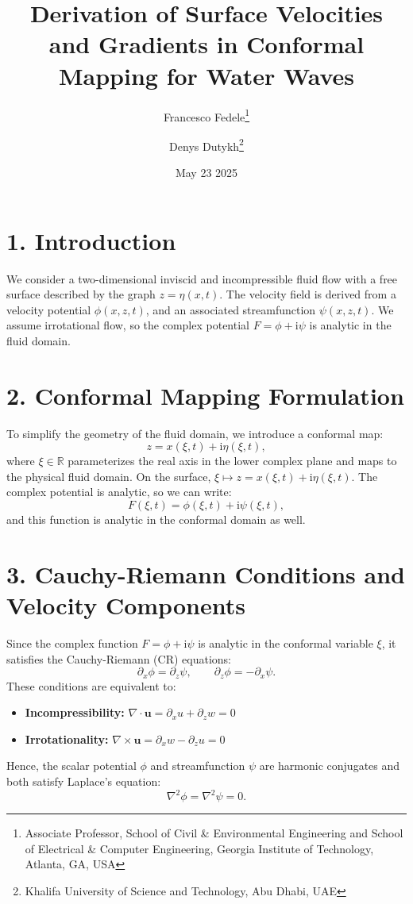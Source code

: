 \documentclass[12pt]{article}
\title{Derivation of Surface Velocities and Gradients in Conformal Mapping for Water Waves}
\author{Francesco Fedele\thanks{Associate Professor, School of Civil \& Environmental Engineering and School of Electrical \& Computer Engineering, Georgia Institute of Technology, Atlanta, GA, USA} \and Denys Dutykh\thanks{Khalifa University of Science and Technology, Abu Dhabi, UAE}}
\date{May 23 2025}
\begin{document}
\maketitle

\section*{1. Introduction}

We consider a two-dimensional inviscid and incompressible fluid flow with a free surface described by the graph \( z = \eta(x,t) \). The velocity field is derived from a velocity potential \( \phi(x,z,t) \), and an associated streamfunction \( \psi(x,z,t) \). We assume irrotational flow, so the complex potential \( F = \phi + \mathrm{i}\psi \) is analytic in the fluid domain.

\section*{2. Conformal Mapping Formulation}

To simplify the geometry of the fluid domain, we introduce a conformal map:
\[
z = x(\xi,t) + \mathrm{i} \eta(\xi,t),
\]
where \( \xi \in \mathbb{R} \) parameterizes the real axis in the lower complex plane and maps to the physical fluid domain. On the surface, \( \xi \mapsto z = x(\xi,t) + \mathrm{i} \eta(\xi,t) \). The complex potential is analytic, so we can write:
\[
F(\xi, t) = \phi(\xi,t) + \mathrm{i}\psi(\xi,t),
\]
and this function is analytic in the conformal domain as well.

\section*{3. Cauchy-Riemann Conditions and Velocity Components}

Since the complex function \( F = \phi + \mathrm{i}\psi \) is analytic in the conformal variable \( \xi \), it satisfies the Cauchy-Riemann (CR) equations:
\[
\partial_x \phi = \partial_z \psi, \qquad \partial_z \phi = -\partial_x \psi.
\]
These conditions are equivalent to:
\begin{itemize}
    \item \textbf{Incompressibility:} \( \nabla \cdot \mathbf{u} = \partial_x u + \partial_z w = 0 \)
    \item \textbf{Irrotationality:} \( \nabla \times \mathbf{u} = \partial_x w - \partial_z u = 0 \)
\end{itemize}
Hence, the scalar potential \( \phi \) and streamfunction \( \psi \) are harmonic conjugates and both satisfy Laplace’s equation:
\[
\nabla^2 \phi = \nabla^2 \psi = 0.
\]
\end{document}

